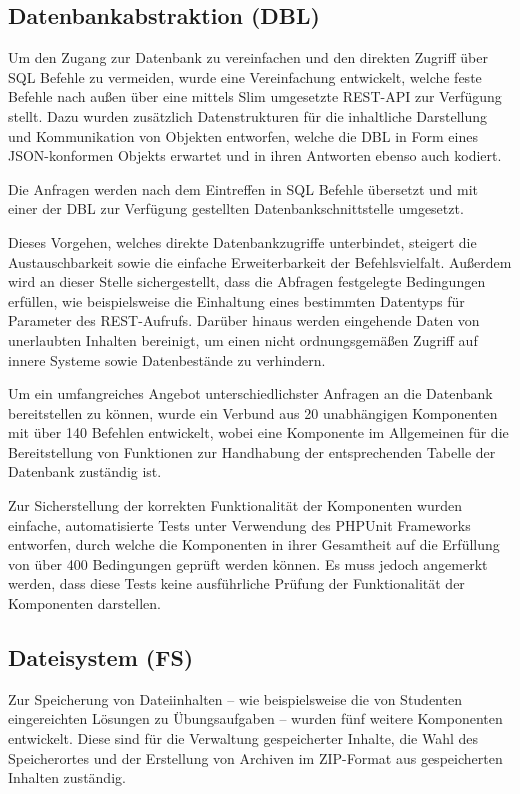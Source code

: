 \documentclass[10pt,a4paper,final,parskip]{scrartcl}
\begin{document}
\subsection{Datenbankabstraktion (DBL)}
\parbox{\textwidth}{Um den Zugang zur Datenbank zu vereinfachen und den direkten Zugriff über SQL Befehle zu vermeiden, wurde eine Vereinfachung entwickelt, welche feste Befehle nach außen über eine mittels Slim umgesetzte REST-API zur Verfügung stellt. Dazu wurden zusätzlich Datenstrukturen für die inhaltliche Darstellung und Kommunikation von Objekten entworfen, welche die DBL in Form eines JSON-konformen Objekts erwartet und in ihren Antworten ebenso auch kodiert.}

\parbox{\textwidth}{Die Anfragen werden nach dem Eintreffen in SQL Befehle übersetzt und mit einer der DBL zur Verfügung gestellten Datenbankschnittstelle umgesetzt.}

\parbox{\textwidth}{Dieses Vorgehen, welches direkte Datenbankzugriffe unterbindet, steigert die Austauschbarkeit sowie die einfache Erweiterbarkeit der Befehlsvielfalt. Außerdem wird an dieser Stelle sichergestellt, dass die Abfragen festgelegte Bedingungen erfüllen, wie beispielsweise die Einhaltung eines bestimmten Datentyps für Parameter des REST-Aufrufs. Darüber hinaus werden eingehende Daten von unerlaubten Inhalten bereinigt, um einen nicht ordnungsgemäßen Zugriff auf innere Systeme sowie Datenbestände zu verhindern.}

\parbox{\textwidth}{Um ein umfangreiches Angebot unterschiedlichster Anfragen an die Datenbank bereitstellen zu können, wurde ein Verbund aus 20 unabhängigen Komponenten mit über 140 Befehlen entwickelt, wobei eine  Komponente im Allgemeinen für die Bereitstellung von Funktionen zur Handhabung der entsprechenden Tabelle der Datenbank zuständig ist.}

\parbox{\textwidth}{Zur Sicherstellung der korrekten Funktionalität der Komponenten wurden einfache, automatisierte Tests unter Verwendung des PHPUnit Frameworks entworfen, durch welche die Komponenten in ihrer Gesamtheit auf die Erfüllung von über 400 Bedingungen geprüft werden können. Es muss jedoch angemerkt werden, dass diese Tests keine ausführliche Prüfung der Funktionalität der Komponenten darstellen.}

\subsection{Dateisystem (FS)}
\parbox{\textwidth}{Zur Speicherung von Dateiinhalten -- wie beispielsweise die von Studenten eingereichten Lösungen zu Übungsaufgaben -- wurden fünf weitere Komponenten entwickelt. Diese sind für die Verwaltung gespeicherter Inhalte, die Wahl des Speicherortes und der Erstellung von Archiven im ZIP-Format aus gespeicherten Inhalten zuständig. }
\end{document}
